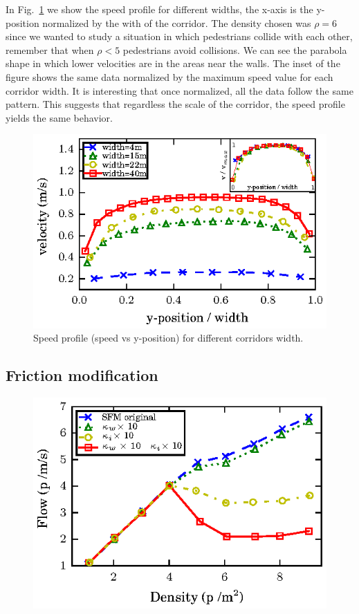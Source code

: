 In Fig.~\ref{speed-profile-multi_width} we show the speed profile for different widths, the x-axis is the y-position normalized by the with of the corridor. The density chosen was $\rho = 6$ since we wanted to study a situation in which pedestrians collide with each other, remember that when $\rho<5$ pedestrians avoid collisions. We can see the parabola shape in which lower velocities are in the areas near the walls. The inset of the figure shows the same data normalized by the maximum speed value for each corridor width. It is interesting that once normalized, all the data follow the same pattern. This suggests that regardless the scale of the corridor, the speed profile yields the same behavior. 


\begin{figure}[htbp!]
\includegraphics[width=\columnwidth]
{plots/v(y)_multi_width.eps}
\caption{\label{speed-profile-multi_width} Speed profile (speed vs y-position) for different corridors width.}
\end{figure}



\subsection{Friction modification}


\begin{figure}[htbp!]
\includegraphics[width=\columnwidth]
{plots/flow-density_pasillo22m_fgmodified_multi.eps}
\caption{\label{fgmodified-w22} }
\end{figure}


